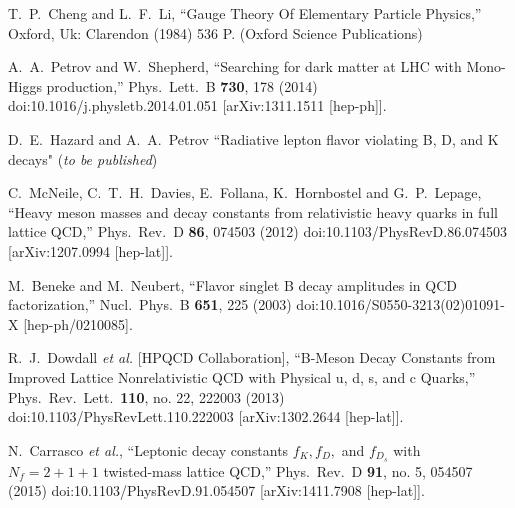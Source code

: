 \documentclass[12pt]{article}
\begin{document}
\begin{thebibliography}{99}
  T.~P.~Cheng and L.~F.~Li,
  ``Gauge Theory Of Elementary Particle Physics,''
  Oxford, Uk: Clarendon (1984) 536 P. (Oxford Science Publications)

  A.~A.~Petrov and W.~Shepherd,
  ``Searching for dark matter at LHC with Mono-Higgs production,''
  Phys.\ Lett.\ B {\bf 730}, 178 (2014)
  doi:10.1016/j.physletb.2014.01.051
  [arXiv:1311.1511 [hep-ph]].

  D.~E.~Hazard and A.~A.~Petrov
  ``Radiative lepton flavor violating B, D, and K decays"
  (\textit{to be published})
  
  C.~McNeile, C.~T.~H.~Davies, E.~Follana, K.~Hornbostel and G.~P.~Lepage,
  ``Heavy meson masses and decay constants from relativistic heavy quarks in full lattice QCD,''
  Phys.\ Rev.\ D {\bf 86}, 074503 (2012)
  doi:10.1103/PhysRevD.86.074503
  [arXiv:1207.0994 [hep-lat]].

  M.~Beneke and M.~Neubert,
  ``Flavor singlet B decay amplitudes in QCD factorization,''
  Nucl.\ Phys.\ B {\bf 651}, 225 (2003)
  doi:10.1016/S0550-3213(02)01091-X
  [hep-ph/0210085].
    
  R.~J.~Dowdall {\it et al.} [HPQCD Collaboration],
  ``B-Meson Decay Constants from Improved Lattice Nonrelativistic QCD with Physical u, d, s, and c Quarks,''
  Phys.\ Rev.\ Lett.\  {\bf 110}, no. 22, 222003 (2013)
  doi:10.1103/PhysRevLett.110.222003
  [arXiv:1302.2644 [hep-lat]].

  N.~Carrasco {\it et al.},
  ``Leptonic decay constants $f_{K},f_{D},$ and $f_{{D}_{s}}$ with $N_{f} = 2+1+1$ twisted-mass lattice QCD,''
  Phys.\ Rev.\ D {\bf 91}, no. 5, 054507 (2015)
  doi:10.1103/PhysRevD.91.054507
  [arXiv:1411.7908 [hep-lat]].
  

\end{thebibliography}
\end{document}
